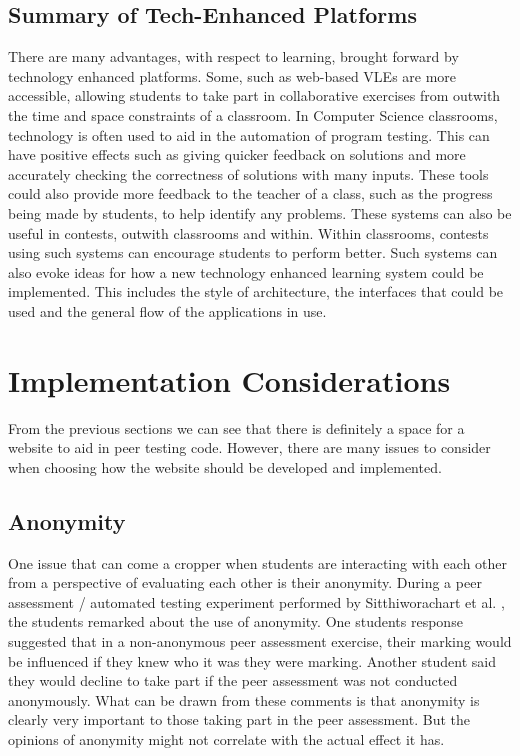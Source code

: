 \documentclass[a4paper,11pt]{report}
\begin{document}
\subsection{Summary of Tech-Enhanced Platforms}
There are many advantages, with respect to learning, brought forward by technology enhanced platforms. Some, such as web-based VLEs are more accessible, allowing students to take part in collaborative exercises from outwith the time and space constraints of a classroom. In Computer Science classrooms, technology is often used to aid in the automation of program testing. This can have positive effects such as giving quicker feedback on solutions and more accurately checking the correctness of solutions with many inputs. These tools could also provide more feedback to the teacher of a class, such as the progress being made by students, to help identify any problems. These systems can also be useful in contests, outwith classrooms and within. Within classrooms, contests using such systems can encourage students to perform better. Such systems can also evoke ideas for how a new technology enhanced learning system could be implemented. This includes the style of architecture, the interfaces that could be used and the general flow of the applications in use.\par




\section{Implementation Considerations}
From the previous sections we can see that there is definitely a space for a website to aid in peer testing code. However, there are many issues to consider when choosing how the website should be developed and implemented.

\subsection{Anonymity}
One issue that can come a cropper when students are interacting with each other from a perspective of evaluating each other is their anonymity. During a peer assessment / automated testing experiment performed by Sitthiworachart et al. \cite{sitthiworachart_effective_2004}, the students remarked about the use of anonymity. One students response suggested that in a non-anonymous peer assessment exercise, their marking would be influenced if they knew who it was they were marking. Another student said they would decline to take part if the peer assessment was not conducted anonymously. What can be drawn from these comments is that anonymity is clearly very important to those taking part in the peer assessment. But the opinions of anonymity might not correlate with the actual effect it has.\par
\end{document}
